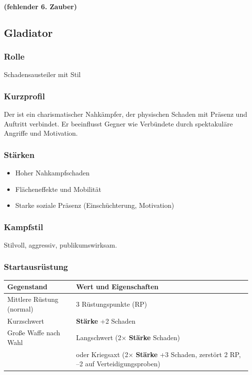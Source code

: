 \paragraph*{(fehlender 6. Zauber)}

\subsection{Gladiator}

\subsubsection*{Rolle}
Schadensausteiler mit Stil

\subsubsection*{Kurzprofil}
Der  ist ein charismatischer Nahkämpfer, der
physischen Schaden mit Präsenz und Auftritt verbindet.
Er beeinflusst Gegner wie Verbündete durch spektakuläre Angriffe und Motivation.

\subsubsection*{Stärken}
\begin{itemize}
	\item Hoher Nahkampfschaden
	\item Flächeneffekte und Mobilität
	\item Starke soziale Präsenz (Einschüchterung, Motivation)
\end{itemize}

\subsubsection*{Kampfstil}
Stilvoll, aggressiv, publikumswirksam.

\subsubsection*{Startausrüstung}

\begin{center}
	\begin{tabular}{lp{9cm}}
		\toprule
		\textbf{Gegenstand} & \textbf{Wert und Eigenschaften} \\
		\midrule
		Mittlere Rüstung (normal) & 3 Rüstungspunkte (RP) \\
		Kurzschwert & \textbf{Stärke} +2 Schaden \\
		Große Waffe nach Wahl &
		Langschwert (2× \textbf{Stärke} Schaden) \\
		& oder Kriegsaxt (2× \textbf{Stärke} +3 Schaden, zerstört 2 RP, --2 auf Verteidigungsproben) \\
		\bottomrule
	\end{tabular}
\end{center}

